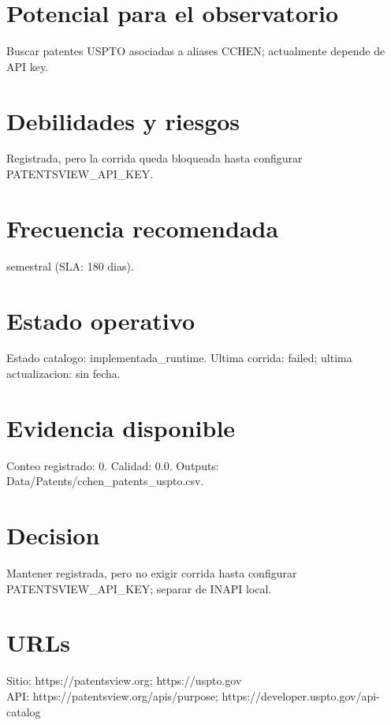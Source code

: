 \documentclass[10pt,a4paper]{article}
\begin{document}
\section*{Potencial para el observatorio}
Buscar patentes USPTO asociadas a aliases CCHEN; actualmente depende de API key.

\section*{Debilidades y riesgos}
Registrada, pero la corrida queda bloqueada hasta configurar PATENTSVIEW\_API\_KEY.

\section*{Frecuencia recomendada}
semestral (SLA: 180 dias).

\section*{Estado operativo}
Estado catalogo: implementada\_runtime. Ultima corrida: failed; ultima actualizacion: sin fecha.

\section*{Evidencia disponible}
Conteo registrado: 0. Calidad: 0.0. Outputs: Data/Patents/cchen\_patents\_uspto.csv.

\section*{Decision}
Mantener registrada, pero no exigir corrida hasta configurar PATENTSVIEW\_API\_KEY; separar de INAPI local.


\section*{URLs}
Sitio: https://patentsview.org; https://uspto.gov\\
API: https://patentsview.org/apis/purpose; https://developer.uspto.gov/api-catalog
\end{document}
